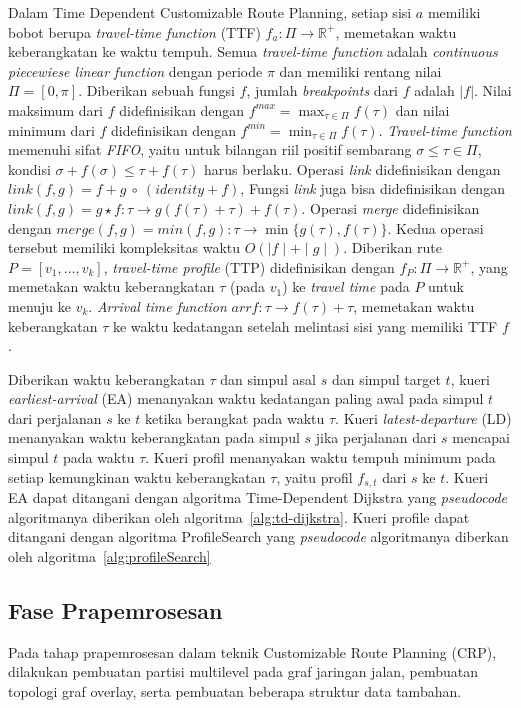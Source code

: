 Dalam Time Dependent Customizable Route Planning, setiap sisi $a$ memiliki bobot berupa \textit{travel-time function} (TTF) $f_a:\Pi\rightarrow \mathbb{R}^{+}$, memetakan waktu keberangkatan ke waktu tempuh. Semua \textit{travel-time function} adalah \textit{continuous piecewiese linear function} dengan periode $\pi$ dan memiliki rentang nilai $\Pi=[0,\pi]$. Diberikan sebuah fungsi $f$, jumlah \textit{breakpoints} dari $f$ adalah $|f| $. Nilai maksimum dari $f$ didefinisikan dengan $f^{max}=\max_{\tau\in\Pi}f(\tau)$ dan nilai minimum dari $f$ didefinisikan dengan $f^{min}=\min_{\tau\in\Pi}f(\tau)$. \textit{Travel-time function} memenuhi sifat \textit{FIFO}, yaitu untuk bilangan riil positif sembarang $\sigma\leq\tau\in\Pi$, kondisi $\sigma+f(\sigma)\leq \tau+f(\tau)$ harus berlaku. Operasi \textit{link} didefinisikan dengan $link(f,g)=f+g \ \circ \ (identity+f)$, Fungsi \textit{link} juga bisa didefinisikan dengan $link(f,g)=g \star f: \tau \rightarrow g(f(\tau)+\tau) + f(\tau)$. Operasi \textit{merge} didefinisikan dengan $merge(f,g)=min(f,g):\tau \rightarrow \min \{g(\tau), f(\tau) \}$. Kedua operasi tersebut memiliki kompleksitas waktu $O(\mid f\mid +\mid g\mid )$. Diberikan rute $P=[v_1,\ldots,v_k]$, \textit{travel-time profile} (TTP) didefinisikan dengan $f_P:\Pi\rightarrow \mathbb{R}^{+}$, yang memetakan waktu keberangkatan $\tau$ (pada $v_1$) ke \textit{travel time} pada $P$ untuk menuju ke $v_k$. \textit{Arrival time function} $arr f:\tau\rightarrow f(\tau)+\tau$, memetakan waktu keberangkatan $\tau$ ke waktu kedatangan setelah melintasi sisi yang memiliki TTF $f$. 

Diberikan waktu keberangkatan $\tau$ dan simpul asal $s$ dan simpul target $t$, kueri \textit{earliest-arrival} (EA) menanyakan waktu kedatangan paling awal pada simpul $t$ dari perjalanan $s$ ke $t$ ketika berangkat pada waktu $\tau$. Kueri \textit{latest-departure} (LD) menanyakan waktu keberangkatan pada simpul $s$ jika perjalanan dari $s$ mencapai simpul $t$ pada waktu $\tau$. Kueri profil menanyakan waktu tempuh minimum pada setiap kemungkinan waktu keberangkatan $\tau$, yaitu profil $f_{s,t}$ dari $s$ ke $t$. Kueri EA dapat ditangani dengan algoritma Time-Dependent Dijkstra yang \textit{pseudocode} algoritmanya diberikan oleh algoritma~\ref{alg:td-dijkstra}. Kueri profile dapat ditangani dengan algoritma ProfileSearch yang \textit{pseudocode} algoritmanya diberkan oleh algoritma~\ref{alg:profileSearch}

\subsection{Fase Prapemrosesan}
\label{subsec:tdcrp-preprocessing}
Pada tahap prapemrosesan dalam teknik Customizable Route Planning (CRP), dilakukan pembuatan partisi multilevel pada graf jaringan jalan, pembuatan topologi graf overlay, serta pembuatan beberapa struktur data tambahan.

